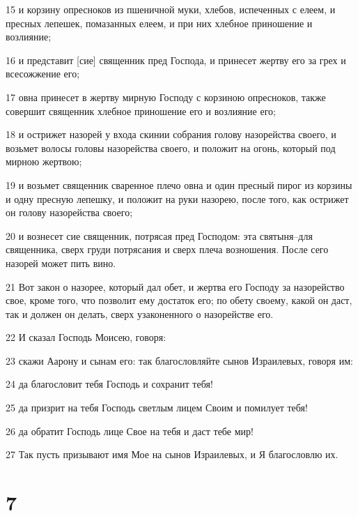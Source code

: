 \par 15 и корзину опресноков из пшеничной муки, хлебов, испеченных с елеем, и пресных лепешек, помазанных елеем, и при них хлебное приношение и возлияние;
\par 16 и представит [сие] священник пред Господа, и принесет жертву его за грех и всесожжение его;
\par 17 овна принесет в жертву мирную Господу с корзиною опресноков, также совершит священник хлебное приношение его и возлияние его;
\par 18 и острижет назорей у входа скинии собрания голову назорейства своего, и возьмет волосы головы назорейства своего, и положит на огонь, который под мирною жертвою;
\par 19 и возьмет священник сваренное плечо овна и один пресный пирог из корзины и одну пресную лепешку, и положит на руки назорею, после того, как острижет он голову назорейства своего;
\par 20 и вознесет сие священник, потрясая пред Господом: эта святыня--для священника, сверх груди потрясания и сверх плеча возношения. После сего назорей может пить вино.
\par 21 Вот закон о назорее, который дал обет, и жертва его Господу за назорейство свое, кроме того, что позволит ему достаток его; по обету своему, какой он даст, так и должен он делать, сверх узаконенного о назорействе его.
\par 22 И сказал Господь Моисею, говоря:
\par 23 скажи Аарону и сынам его: так благословляйте сынов Израилевых, говоря им:
\par 24 да благословит тебя Господь и сохранит тебя!
\par 25 да призрит на тебя Господь светлым лицем Своим и помилует тебя!
\par 26 да обратит Господь лице Свое на тебя и даст тебе мир!
\par 27 Так пусть призывают имя Мое на сынов Израилевых, и Я благословлю их.

\chapter{7}

